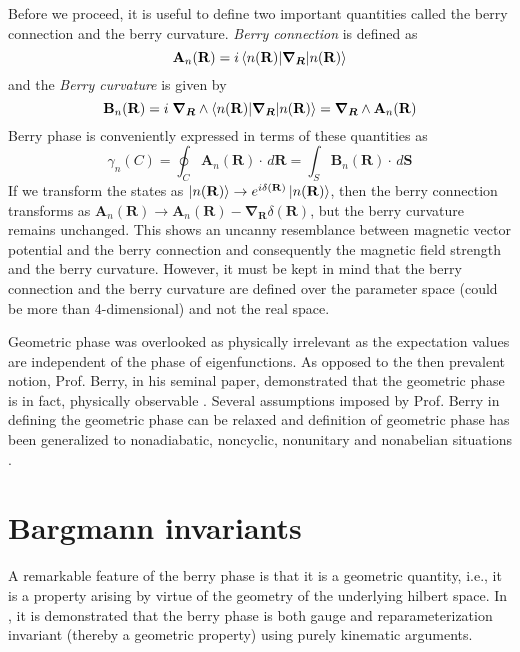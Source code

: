 Before we proceed, it is useful to define two important quantities called the berry connection and the berry curvature. \emph{Berry connection} is defined as
\begin{equation}
 \mathbf{A}_{n}(\mathbf{R}) = i\braket{n(\mathbf{R})| \bm{\nabla_{R}} | n(\mathbf{R})}
\end{equation}
and the \emph{Berry curvature} is given by
\begin{equation}
 \mathbf{B}_{n}(\mathbf{R}) = i \;\bm{\nabla_{R}} \wedge \braket{n(\mathbf{R})| \bm{\nabla_{R}} | n(\mathbf{R})} = \bm{\nabla_{R}} \wedge \mathbf{A}_{n}(\mathbf{R})
\end{equation} Berry phase is conveniently expressed in terms of these quantities as
\begin{equation}
 \gamma_{n}(C)= \oint_{C}{\mathbf{A}_{n}(\mathbf{R})\cdot \, d\mathbf{R}} = \int_{S}{\mathbf{B}_{n}(\mathbf{R})\cdot \, d\mathbf{S}}
\end{equation}
If we transform the states as $\ket{n(\mathbf{R})} \rightarrow e^{i\delta(\mathbf{R})} \ket{n(\mathbf{R})}$, then the berry connection transforms as
$\mathbf{A}_{n}(\mathbf{R}) \rightarrow \mathbf{A}_{n}(\mathbf{R}) - \bm{\nabla_{R}} \delta(\mathbf{R})$, but the berry curvature remains unchanged. This shows an uncanny
resemblance between magnetic vector potential and the berry connection and consequently the magnetic field strength and the berry curvature. However, it must be kept in mind that
the berry connection and the berry curvature are defined over the parameter space (could be more than 4-dimensional) and not the real space.

Geometric phase was overlooked as physically irrelevant as the expectation values are independent of the phase of eigenfunctions. 
As opposed to the then prevalent notion, Prof. Berry, in his seminal paper, demonstrated that the geometric phase is in fact, physically observable \cite{berry1984quantal,wilczek1989geometric}.
Several assumptions imposed by Prof. Berry in defining the geometric phase can be relaxed and definition of geometric phase has been generalized to nonadiabatic, noncyclic, 
nonunitary and nonabelian situations \cite{aharonov1987phase, samuel1988general, wilczek1984appearance, mukunda1993quantum}.

\section{Bargmann invariants}
A remarkable feature of the berry phase is that it is a geometric quantity, i.e., it is a property arising by virtue of the geometry of the 
underlying hilbert space. In \parencite{mukunda1993quantum}, it is demonstrated that the berry phase is both gauge and reparameterization 
invariant (thereby a geometric property) using purely kinematic arguments.

